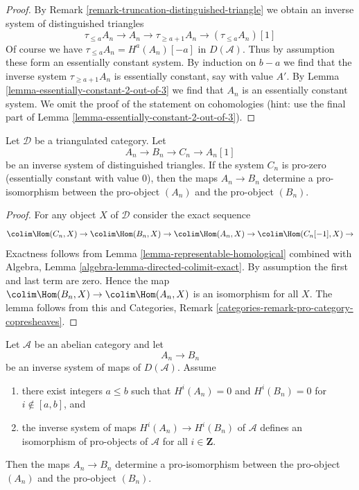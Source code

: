 \begin{proof}
By Remark \ref{remark-truncation-distinguished-triangle} we obtain
an inverse system of distinguished triangles
$$
\tau_{\leq a}A_n \to A_n \to \tau_{\geq a + 1}A_n \to (\tau_{\leq a}A_n)[1]
$$
Of course we have $\tau_{\leq a}A_n = H^a(A_n)[-a]$ in $D(\mathcal{A})$.
Thus by assumption these form an essentially constant system.
By induction on $b - a$ we find that the inverse system
$\tau_{\geq a + 1}A_n$ is essentially constant, say with value $A'$.
By Lemma \ref{lemma-essentially-constant-2-out-of-3} we find that
$A_n$ is an essentially constant system. We omit the proof of
the statement on cohomologies (hint: use the final part of
Lemma \ref{lemma-essentially-constant-2-out-of-3}).
\end{proof}

\begin{lemma}
\label{lemma-pro-isomorphism}
Let $\mathcal{D}$ be a triangulated category. Let
$$
A_n \to B_n \to C_n \to A_n[1]
$$
be an inverse system of distinguished triangles. If the system $C_n$
is pro-zero (essentially constant with value $0$), then the maps
$A_n \to B_n$ determine a pro-isomorphism between the pro-object $(A_n)$
and the pro-object $(B_n)$.
\end{lemma}

\begin{proof}
For any object $X$ of $\mathcal{D}$ consider the exact sequence
$$
\colim \Hom(C_n, X) \to
\colim \Hom(B_n, X) \to
\colim \Hom(A_n, X) \to
\colim \Hom(C_n[-1], X) \to
$$
Exactness follows from Lemma \ref{lemma-representable-homological}
combined with
Algebra, Lemma \ref{algebra-lemma-directed-colimit-exact}.
By assumption the first and last term are zero. Hence the map
$\colim \Hom(B_n, X) \to \colim \Hom(A_n, X)$ is an isomorphism
for all $X$. The lemma follows from this and
Categories, Remark \ref{categories-remark-pro-category-copresheaves}.
\end{proof}

\begin{lemma}
\label{lemma-pro-isomorphism-bis}
Let $\mathcal{A}$ be an abelian category and let
$$
A_n \to B_n
$$
be an inverse system of maps of $D(\mathcal{A})$. Assume
\begin{enumerate}
\item there exist integers $a \leq b$ such that $H^i(A_n) = 0$
and $H^i(B_n) = 0$ for $i \not \in [a, b]$, and
\item the inverse system of maps $H^i(A_n) \to H^i(B_n)$ of $\mathcal{A}$
defines an isomorphism of pro-objects of $\mathcal{A}$
for all $i \in \mathbf{Z}$.
\end{enumerate}
Then the maps $A_n \to B_n$
determine a pro-isomorphism between the pro-object $(A_n)$
and the pro-object $(B_n)$.
\end{lemma}

